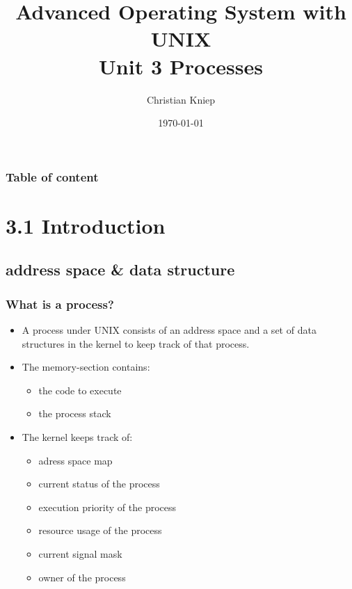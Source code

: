 \documentclass[hyperref={pdfpagelabels=false}]{beamer}
\author{Christian Kniep}
\begin{document}
\title[UNIX Unit 3]{Advanced Operating System with UNIX \\ Unit 3 Processes}  
\date[\today]{\today} 

\begin{frame}
	\titlepage
\end{frame} 

\begin{frame}
	\frametitle{Table of content}
	\tableofcontents
\end{frame} 


\section{3.1 Introduction}
    \subsection{address space \& data structure}
		\begin{frame}
			\frametitle{What is a process?}
			\begin{itemize}
				\item<1-> A process under UNIX consists of an  address space and a set of data structures in the kernel to keep track of that process.
                \item<2-> The memory-section contains:
                \begin{itemize}
                    \item<2-> the code to execute
                    \item<2-> the process stack
                \end{itemize}
                \item<3-> The kernel keeps track of:
                \begin{itemize}
                    \item<3-> adress space map
                    \item<3-> current status of the process
                    \item<3-> execution priority of the process
                    \item<3-> resource usage of the process
                    \item<3-> current signal mask
                    \item<3-> owner of the process
                \end{itemize}
            \end{itemize}
		\end{frame}
\end{document}
